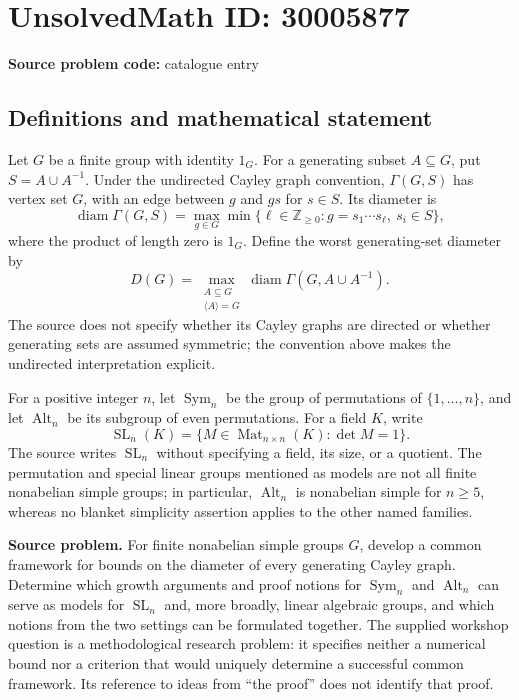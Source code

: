 \documentclass[11pt]{article}
\newcommand{\Z}{\mathbb{Z}}
\begin{document}
\section*{UnsolvedMath ID: 30005877}
\textbf{Source problem code:} catalogue entry
\subsection{Definitions and mathematical statement}
Let \(G\) be a finite group with identity \(1_G\). For a generating subset \(A\subseteq G\), put \(S=A\cup A^{-1}\). Under the undirected Cayley graph convention, \(\Gamma(G,S)\) has vertex set \(G\), with an edge between \(g\) and \(gs\) for \(s\in S\). Its diameter is
\[
\operatorname{diam}\Gamma(G,S)
=\max_{g\in G}\min\{\ell\in\Z_{\geq 0}:g=s_1\cdots s_\ell,\ s_i\in S\},
\]
where the product of length zero is \(1_G\). Define the worst generating-set diameter by
\[
D(G)=\max_{\substack{A\subseteq G\\\langle A\rangle=G}}
\operatorname{diam}\Gamma(G,A\cup A^{-1}).
\]
The source does not specify whether its Cayley graphs are directed or whether generating sets are assumed symmetric; the convention above makes the undirected interpretation explicit.

For a positive integer \(n\), let \(\operatorname{Sym}_n\) be the group of permutations of \(\{1,\ldots,n\}\), and let \(\operatorname{Alt}_n\) be its subgroup of even permutations. For a field \(K\), write
\[
\operatorname{SL}_n(K)=\{M\in\operatorname{Mat}_{n\times n}(K):\det M=1\}.
\]
The source writes \(\operatorname{SL}_n\) without specifying a field, its size, or a quotient. The permutation and special linear groups mentioned as models are not all finite nonabelian simple groups; in particular, \(\operatorname{Alt}_n\) is nonabelian simple for \(n\geq5\), whereas no blanket simplicity assertion applies to the other named families.

\textbf{Source problem.} For finite nonabelian simple groups \(G\), develop a common framework for bounds on the diameter of every generating Cayley graph. Determine which growth arguments and proof notions for \(\operatorname{Sym}_n\) and \(\operatorname{Alt}_n\) can serve as models for \(\operatorname{SL}_n\) and, more broadly, linear algebraic groups, and which notions from the two settings can be formulated together. The supplied workshop question is a methodological research problem: it specifies neither a numerical bound nor a criterion that would uniquely determine a successful common framework. Its reference to ideas from ``the proof'' does not identify that proof.
\end{document}

